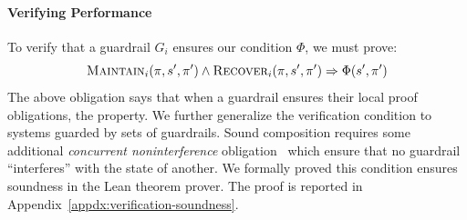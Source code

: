 \paragraph{Verifying Performance}
To verify that a guardrail $G_i$ ensures our \perfsafety condition $\Phi$, we must prove:
\[
\textsc{Maintain}_i(\pi, s', \pi')
\wedge 
\textsc{Recover}_i(\pi, s', \pi')
\Rightarrow \Phi(s', \pi')
\]
The above obligation says that when a guardrail ensures their local proof obligations, the \perfsafety property. We further generalize the verification condition to systems guarded by sets of guardrails. Sound composition requires some additional \emph{concurrent noninterference} obligation~\cite{ewd117} which ensure that no guardrail ``interferes'' with the state of another. We formally proved this condition ensures soundness in the Lean theorem prover. The proof is reported in Appendix~\ref{appdx:verification-soundness}.

